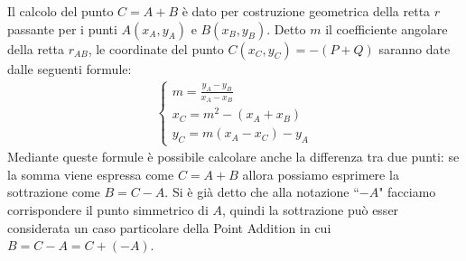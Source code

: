 \documentclass[a4paper,12pt]{tesiinfo}
\newcommand\ddfrac[2]{\frac{\displaystyle #1}{\displaystyle #2}}
\begin{document}
Il calcolo del punto $C = A + B$ \`e dato per costruzione geometrica della retta $r$ passante per i punti $A(x_A, y_A)$ e $B(x_B, y_B)$. Detto $m$ il coefficiente angolare della retta $r_{AB}$, le coordinate del punto $C(x_C, y_C) = -(P+Q)$ saranno date dalle seguenti formule:
\begin{align*}
\begin{cases}
m = \ddfrac{y_A - y_B}{x_A - x_B}\\
x_C = m^2 - (x_A + x_B)\\
y_C = m(x_A - x_C)-y_A
\end{cases}
\end{align*}
Mediante queste formule \`e possibile calcolare anche la differenza tra due punti: se la somma viene espressa come $C = A+B$ allora possiamo esprimere la sottrazione come $B=C-A$. Si \`e gi\`a detto che alla notazione ``$-A$" facciamo corrispondere il punto simmetrico di $A$, quindi la sottrazione pu\`o esser considerata un caso particolare della Point Addition in cui $B=C-A = C + (-A)$.
\end{document}
